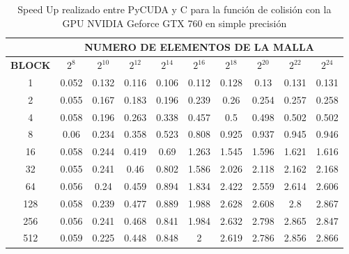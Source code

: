 \begin{table}[h!]
	\centering
	\begin{tabular}{|c|c|c|c|c|c|c|c|c|c|}
		\hline
		& \multicolumn{9}{c|}{\textbf{NUMERO DE ELEMENTOS DE LA MALLA}} \\ \hline
		\textbf{BLOCK} & $2^{8}$ & $2^{10}$& $2^{12}$& $2^{14}$& $2^{16}$& $2^{18}$& $2^{20}$& $2^{22}$& $2^{24}$\\ \hline
		1                               & 0.052   & 0.132    & 0.116    & 0.106    & 0.112    & 0.128    & 0.13     & 0.131    & 0.131 \\ \hline
		2                               & 0.055   & 0.167    & 0.183    & 0.196    & 0.239    & 0.26     & 0.254    & 0.257    & 0.258 \\ \hline
		4                               & 0.058   & 0.196    & 0.263    & 0.338    & 0.457    & 0.5      & 0.498    & 0.502    & 0.502 \\ \hline
		8                               & 0.06    & 0.234    & 0.358    & 0.523    & 0.808    & 0.925    & 0.937    & 0.945    & 0.946 \\ \hline
		16                              & 0.058   & 0.244    & 0.419    & 0.69     & 1.263    & 1.545    & 1.596    & 1.621    & 1.616 \\ \hline
		32                              & 0.055   & 0.241    & 0.46     & 0.802    & 1.586    & 2.026    & 2.118    & 2.162    & 2.168 \\ \hline
		64                              & 0.056   & 0.24     & 0.459    & 0.894    & 1.834    & 2.422    & 2.559    & 2.614    & 2.606 \\ \hline
		128                             & 0.058   & 0.239    & 0.477    & 0.889    & 1.988    & 2.628    & 2.608    & 2.8      & 2.867 \\ \hline
		256                             & 0.056   & 0.241    & 0.468    & 0.841    & 1.984    & 2.632    & 2.798    & 2.865    & 2.847 \\ \hline
		512                             & 0.059   & 0.225    & 0.448    & 0.848    & 2        & 2.619    & 2.786    & 2.856    & 2.866 \\ \hline
	\end{tabular}
	\caption{Speed Up realizado entre PyCUDA y C para la función de colisión con la GPU NVIDIA Geforce GTX 760 en simple precisión}
	\label{tab:s_py_c_760_test_simple_10}
\end{table}